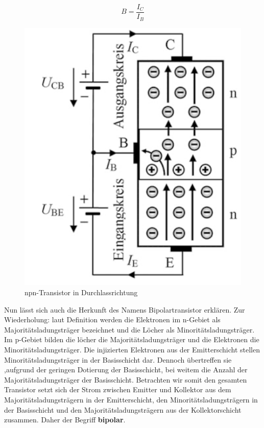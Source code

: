 \begin{equation}
B = \dfrac{I_C}{I_B}
\end{equation}

\begin{figure}[!htb]
	\centering
	\includegraphics[scale=0.6]{images/npnTransistorDurchlass.png} 
	\caption{npn-Transistor in Durchlassrichtung \cite{Stiny2018}}
	\label{img: TransistorDurchlassrichtung}
\end{figure}

Nun lässt sich auch die Herkunft des Namens Bipolartransistor erklären. Zur Wiederholung: laut Definition werden die Elektronen im n-Gebiet als Majoritätsladungsträger bezeichnet und die Löcher als Minoritätsladungsträger. Im p-Gebiet bilden die löcher die Majoritätsladungsträger und die Elektronen die Minoritätsladungsträger. 
Die injizierten Elektronen aus der Emitterschicht stellen Minoritätsladungsträger in der Basisschicht dar. Dennoch übertreffen sie ,aufgrund der geringen Dotierung der Basisschicht, bei weitem die Anzahl der Majoritätsladungsträger der Basisschicht. 
Betrachten wir somit den gesamten Transistor setzt sich der Strom zwischen Emitter und Kollektor aus dem Majoritätsladungsträgern in der Emitterschicht, den Minoritätsladungsträgern in der Basisschicht und den Majoritätsladungsträgern aus der Kollektorschicht zusammen. Daher der Begriff  \textbf{bipolar}.




 
